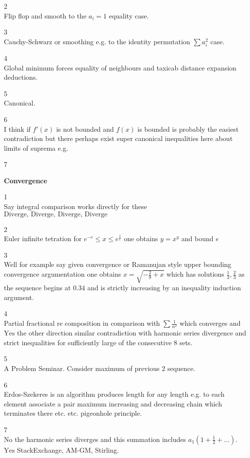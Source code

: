 2 \\
Flip flop and smooth to the $a_i=1$ equality case.

3 \\
Cauchy-Schwarz or smoothing e.g. to the identity permutation $\sum a_i^2$ case.

4 \\
Global minimum forces equality of neighbours and taxicab distance expansion deductions.

5 \\
Canonical.

6 \\
I think if $f'(x)$ is not bounded and $f(x)$ is bounded is probably the easiest contradiction but there perhaps exist super canonical inequalities here about limits of suprema e.g.

7 \\


\newpage

\textbf{Convergence}

1 \\
Say integral comparison works directly for these $\boxed{\text{Diverge, Diverge, Diverge, Diverge}}$

2 \\
Euler infinite tetration for $e^{-e}\le x\le e^{\frac{1}{e}}$ one obtains $y=x^y$ and bound $\boxed{e}$

3 \\
Well for example say given convergence or Ramanujan style upper bounding convergence argumentation one obtains $x=\sqrt{-\frac{2}{9}+x}$ which has solutions $\frac{1}{3},\boxed{\frac{2}{3}}$ as the sequence begins at $0.34$ and is strictly increasing by an inequality induction argument.

4 \\
Partial fractional re composition in comparison with $\sum \frac{1}{n^2}$ which converges and $\boxed{\text{Yes}}$ the other direction similar contradiction with harmonic series divergence and strict inequalities for sufficiently large of the consecutive $8$ sets.

5 \\
A Problem Seminar. Consider maximum of previous $2$ sequence.

6 \\
Erdos-Szekeres is an algorithm produces length for any length e.g. to each element associate a pair maximum increasing and decreasing chain which terminates there etc. etc. pigeonhole principle.

7 \\
$\boxed{\text{No}}$ the harmonic series diverges and this summation includes $a_1(1+\frac{1}{2}+\dots)$. $\boxed{\text{Yes}}$ StackExchange, AM-GM, Stirling.

